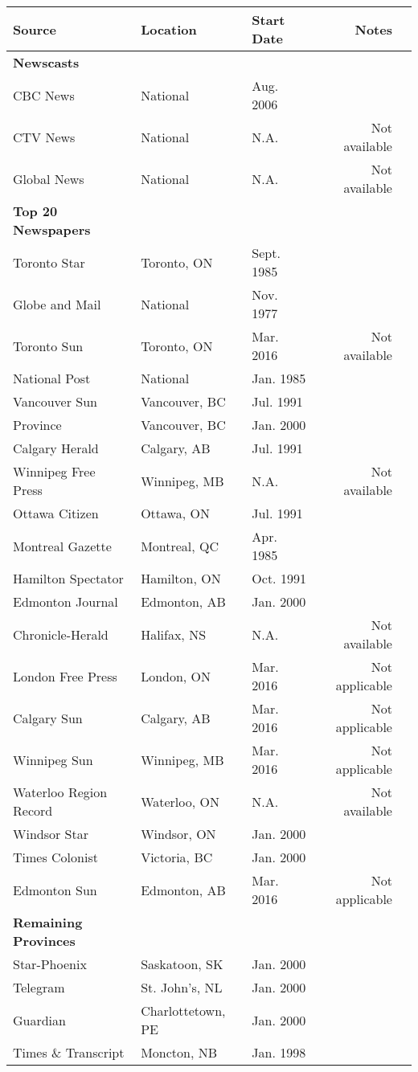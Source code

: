 \begin{longtable}{l l l r l}
\textbf{Source} & \textbf{Location} & \textbf{Start Date} & \textbf{Notes} \\
\hline
\textbf{Newscasts} & & & \\
CBC News & National & Aug. 2006 & \\
CTV News & National & N.A. & Not available \\
Global News & National & N.A. & Not available \\
\hline
\textbf{Top 20 Newspapers} & & \\
Toronto Star & Toronto, ON & Sept. 1985 & \\
Globe and Mail & National & Nov. 1977 & \\
Toronto Sun & Toronto, ON & Mar. 2016 & Not available \\
National Post & National & Jan. 1985 & \\
Vancouver Sun & Vancouver, BC & Jul. 1991 & \\
Province & Vancouver, BC & Jan. 2000 & \\
Calgary Herald & Calgary, AB & Jul. 1991 & \\
Winnipeg Free Press & Winnipeg, MB & N.A. & Not available \\
Ottawa Citizen & Ottawa, ON & Jul. 1991 & \\
Montreal Gazette & Montreal, QC & Apr. 1985 & \\
Hamilton Spectator & Hamilton, ON & Oct. 1991 & \\
Edmonton Journal & Edmonton, AB & Jan. 2000 & \\
Chronicle-Herald & Halifax, NS & N.A. & Not available \\
London Free Press & London, ON & Mar. 2016 & Not applicable \\
Calgary Sun & Calgary, AB & Mar. 2016 & Not applicable \\
Winnipeg Sun & Winnipeg, MB & Mar. 2016 & Not applicable \\
Waterloo Region Record & Waterloo, ON & N.A. & Not available \\
Windsor Star & Windsor, ON & Jan. 2000 & \\
Times Colonist & Victoria, BC & Jan. 2000 & \\
Edmonton Sun & Edmonton, AB & Mar. 2016 & Not applicable \\
\hline 
\textbf{Remaining Provinces} & & \\
Star-Phoenix & Saskatoon, SK & Jan. 2000 & \\
Telegram & St. John's, NL & Jan. 2000 & \\
Guardian & Charlottetown, PE & Jan. 2000 & \\
Times \& Transcript & Moncton, NB & Jan. 1998 & \\
\hline 
\end{longtable}
